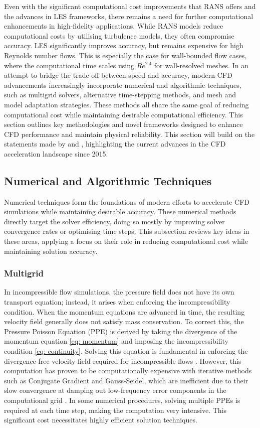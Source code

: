 Even with the significant computational cost improvements that RANS offers and the advances in LES frameworks, there remains a need for further computational enhancements in high-fidelity applications. While RANS models reduce computational costs by utilising turbulence models, they often compromise accuracy. LES significantly improves accuracy, but remains expensive for high Reynolds number flows. This is especially the case for wall-bounded flow cases, where the computational time scales using $Re^{2.4}$ for wall-resolved meshes. In an attempt to bridge the trade-off between speed and accuracy, modern CFD advancements increasingly incorporate numerical and algorithmic techniques, such as multigrid solvers, alternative time-stepping methods, and mesh and model adaptation strategies. These methods all share the same goal of reducing computational cost while maintaining desirable computational efficiency. This section outlines key methodologies and novel frameworks designed to enhance CFD performance and maintain physical reliability. This section will build on the statements made by \textcite{Hosain2015} and \textcite{Afzal2017}, highlighting the current advances in the CFD acceleration landscape since 2015. 

\subsection{Numerical and Algorithmic Techniques}



Numerical techniques form the foundations of modern efforts to accelerate CFD simulations while maintaining desirable accuracy. These numerical methods directly target the solver efficiency, doing so mostly by improving solver convergence rates or optimising time steps. This subsection reviews key ideas in these areas, applying a focus on their role in reducing computational cost while maintaining solution accuracy. 

\subsubsection{Multigrid}

In incompressible flow simulations, the pressure field does not have its own transport equation; instead, it arises when enforcing the incompressibility condition. When the momentum equations are advanced in time, the resulting velocity field generally does not satisfy mass conservation. To correct this, the Pressure Poisson Equation (PPE) is derived by taking the divergence of the momentum equation \ref{eq: momentum} and imposing the incompressibility condition \ref{eq: continuity}. Solving this equation is fundamental in enforcing the divergence-free velocity field required for incompressible flows \cite{Driss2018}. However, this computation has proven to be computationally expensive with iterative methods such as Conjugate Gradient and Gauss-Seidel, which are inefficient due to their slow convergence at damping out low-frequency error components in the computational grid \cite{Driss2018}. In some numerical procedures, solving multiple PPEs is required at each time step, making the computation very intensive. This significant cost necessitates highly efficient solution techniques.  

